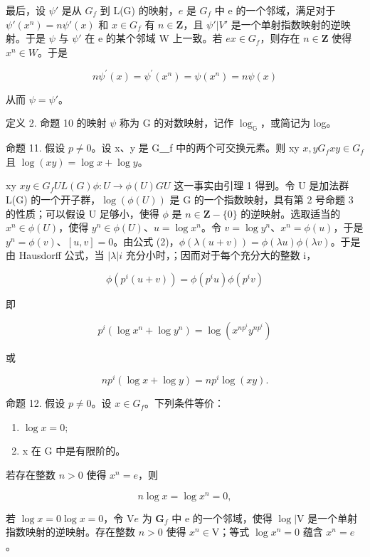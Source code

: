 最后，设 \(\psi'\) 是从 \(G_f\) 到 L(G) 的映射，\(e\) 是 \(G_f\) 中 e 的一个邻域，满足对于 \(\psi'(x^n) = n\psi'(x)\) 和 \(x \in G_f\) 有 \(n \in \mathbf{Z}\)，且 \(\psi'|V'\) 是一个单射指数映射的逆映射。于是 \(\psi\) 与 \(\psi'\) 在 e 的某个邻域 W 上一致。若 \(e\)\(x \in G_f\)，则存在 \(n \in \mathbf{Z}\) 使得 \(x^n \in W\)。于是

\[
n \psi^ {\prime} (x) = \psi^ {\prime} (x ^ {n}) = \psi (x ^ {n}) = n \psi (x)
\]

从而 \(\psi = \psi'\)。

定义 2. 命题 10 的映射 \(\psi\) 称为 G 的对数映射，记作 \(\log_{\mathbb{G}}\)，或简记为 log。

命题 11. 假设 \(p \neq 0\)。设 x、y 是 G＿f 中的两个可交换元素。则 xy \(x, y\)\(G_f\)\(xy \in G_f\) 且 \(\log(xy) = \log x + \log y\)。

xy \(xy \in G_f\)\(U\)\(L(G)\)\(\phi: U \to \phi(U)\)\(G\)\(U\) 这一事实由引理 1 得到。令 U 是加法群 L(G) 的一个开子群，\(\log(\phi(U))\) 是 G 的一个指数映射，具有第 2 号命题 3 的性质；可以假设 U 足够小，使得 \(\phi\) 是 \(n \in \mathbf{Z} - \{0\}\) 的逆映射。选取适当的 \(x^n \in \phi(U)\)，使得 \(y^n \in \phi(U)\)、\(u = \log x^n\)。令 \(v = \log y^n\)、\(x^n = \phi(u)\)，于是 \(y^n = \phi(v)\)、\([u,v] = 0\)。由公式 (2)，\(\phi(\lambda(u + v)) = \phi(\lambda u)\phi(\lambda v)\)。于是由 Hausdorff 公式，当 \(|\lambda|\)\(i\) 充分小时，；因而对于每个充分大的整数 i，

\[
\phi (p ^ {i} (u + v)) = \phi (p ^ {i} u) \phi (p ^ {i} v)
\]

即

\[
p ^ {i} (\log x ^ {n} + \log y ^ {n}) = \log (x ^ {n p ^ {i}} y ^ {n p ^ {i}})
\]

或

\[
n p ^ {i} (\log x + \log y) = n p ^ {i} \log (x y).
\]

命题 12. 假设 \(p \neq 0\)。设 \(x \in G_f\)。下列条件等价：

\begin{enumerate}
\def\labelenumi{(\roman{enumi})}
\item
  \(\log x = 0;\)
\item
  x 在 G 中是有限阶的。
\end{enumerate}

若存在整数 \(n > 0\) 使得 \(x^n = e\)，则

\[
n \log x = \log x ^ {n} = 0,
\]

若 \(\log x = 0\)\(\log x = 0\)，令 \(\mathrm{V}\)\(e\) 为 \(\mathbf{G}_f\) 中 e 的一个邻域，使得 \(\log |\mathrm{V}\) 是一个单射指数映射的逆映射。存在整数 \(n > 0\) 使得 \(x^n \in \mathrm{V}\)；等式 \(\log x^n = 0\) 蕴含 \(x^n = e\)。

